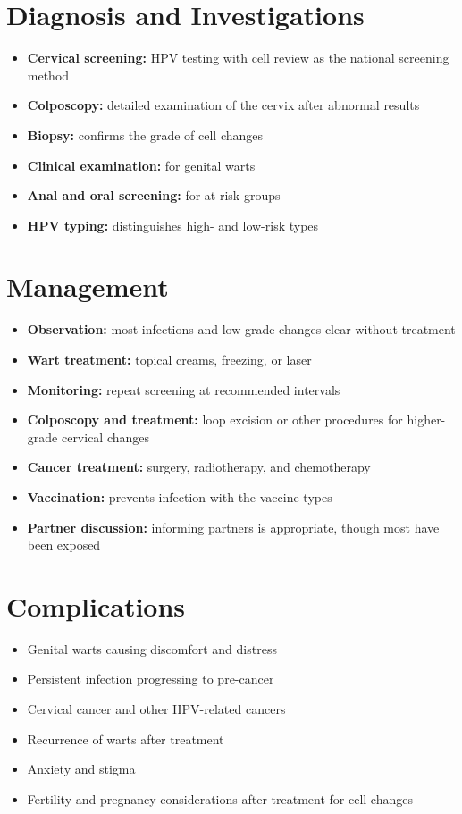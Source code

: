 \section*{Diagnosis and Investigations}
\begin{itemize}
    \item \textbf{Cervical screening:} HPV testing with cell review as the national screening method
    \item \textbf{Colposcopy:} detailed examination of the cervix after abnormal results
    \item \textbf{Biopsy:} confirms the grade of cell changes
    \item \textbf{Clinical examination:} for genital warts
    \item \textbf{Anal and oral screening:} for at-risk groups
    \item \textbf{HPV typing:} distinguishes high- and low-risk types
\end{itemize}

\section*{Management}
\begin{itemize}
    \item \textbf{Observation:} most infections and low-grade changes clear without treatment
    \item \textbf{Wart treatment:} topical creams, freezing, or laser
    \item \textbf{Monitoring:} repeat screening at recommended intervals
    \item \textbf{Colposcopy and treatment:} loop excision or other procedures for higher-grade cervical changes
    \item \textbf{Cancer treatment:} surgery, radiotherapy, and chemotherapy
    \item \textbf{Vaccination:} prevents infection with the vaccine types
    \item \textbf{Partner discussion:} informing partners is appropriate, though most have been exposed
\end{itemize}

\section*{Complications}
\begin{itemize}
    \item Genital warts causing discomfort and distress
    \item Persistent infection progressing to pre-cancer
    \item Cervical cancer and other HPV-related cancers
    \item Recurrence of warts after treatment
    \item Anxiety and stigma
    \item Fertility and pregnancy considerations after treatment for cell changes
\end{itemize}


